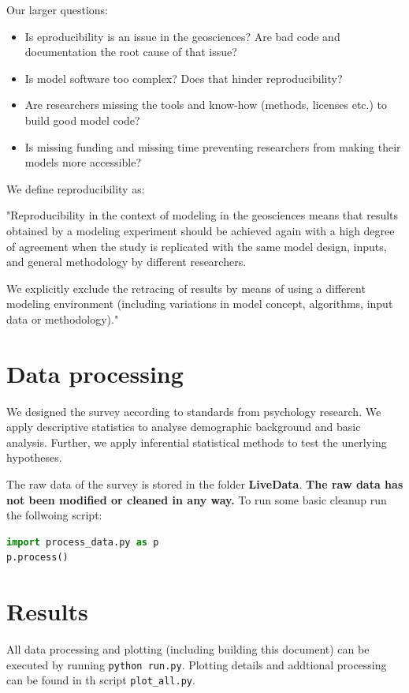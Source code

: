 \documentclass{article}
\begin{document}
Our larger questions:
\begin{itemize}
	\item Is eproducibility is an issue in the geosciences? Are bad code and documentation the root cause of that issue?
	\item Is model software too complex? Does that hinder reproducibility?
	\item Are researchers missing the tools and know-how (methods, licenses etc.) to build good model code?
	\item Is missing funding and missing time preventing researchers from making their models more accessible?
\end{itemize}

We define reproducibility as:

"Reproducibility in the context of modeling in the geosciences means that results obtained by a modeling experiment should be achieved again with a high degree of agreement when the study is replicated with the same model design, inputs, and general methodology by different researchers.

We explicitly exclude the retracing of results by means of using a different modeling environment (including variations in model concept, algorithms, input data or methodology)."

\section{Data processing}
We designed the survey according to standards from psychology research. We apply descriptive statistics to analyse demographic background and basic analysis.
Further, we apply inferential statistical methods to test the unerlying hypotheses.

The raw data of the survey is stored in the folder \textbf{LiveData}. \textbf{The raw data has not been modified or cleaned in any way.}
To run some basic cleanup run the follwoing script: 

\begin{lstlisting}[language=Python]
import process_data.py as p
p.process()
\end{lstlisting}

\section{Results}
All data processing and plotting (including building this document) can be executed by running \lstinline{python run.py}.
Plotting details and addtional processing can be found in th script \lstinline{plot_all.py}.
\end{document}
